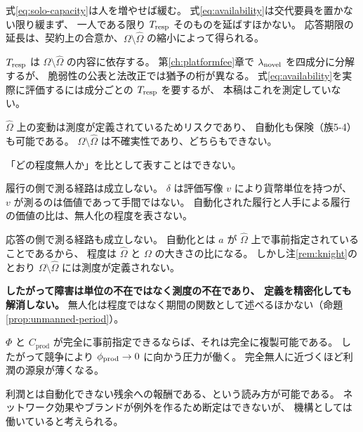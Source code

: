 \begin{remark}[緩和の方向が異なる]
式\eqref{eq:solo-capacity}は人を増やせば緩む。
式\eqref{eq:availability}は交代要員を置かない限り緩まず、
一人である限り $T_{\rm resp}$ そのものを延ばすほかない。
応答期限の延長は、契約上の合意か、$\Omega\setminus\hat\Omega$ の縮小によって得られる。
\end{remark}

\begin{remark}
\label{rem:tresp-components}
$T_{\rm resp}$ は $\Omega\setminus\hat\Omega$ の内容に依存する。
第\ref{ch:platformfee}章で $\lambda_{\rm novel}$ を四成分に分解するが、
脆弱性の公表と法改正では猶予の桁が異なる。
式\eqref{eq:availability}を実際に評価するには成分ごとの $T_{\rm resp}$ を要するが、
本稿はこれを測定していない。
\end{remark}

\begin{remark}[ナイトの区別との対応]
\label{rem:knight}
$\hat\Omega$ 上の変動は測度が定義されているためリスクであり、
自動化も保険（族5-4）も可能である。
$\Omega\setminus\hat\Omega$ は不確実性であり、どちらもできない。
\end{remark}

\begin{remark}[無人化の程度は定義できない]
\label{rem:automation-rate-illposed}
「どの程度無人か」を比として表すことはできない。

履行の側で測る経路は成立しない。
$\delta$ は評価写像 $v$ により貨幣単位を持つが、
$v$ が測るのは価値であって手間ではない。
自動化された履行と人手による履行の価値の比は、無人化の程度を表さない。

応答の側で測る経路も成立しない。
自動化とは $a$ が $\hat\Omega$ 上で事前指定されていることであるから、
程度は $\hat\Omega$ と $\Omega$ の大きさの比になる。
しかし注\ref{rem:knight}のとおり $\Omega\setminus\hat\Omega$ には測度が定義されない。

\textbf{したがって障害は単位の不在ではなく測度の不在であり、
定義を精密化しても解消しない。}
無人化は程度ではなく期間の関数として述べるほかない（命題\ref{prop:unmanned-period}）。
\end{remark}

\begin{remark}[無人化と利潤の関係]
$\Phi$ と $C_{\mathrm{prod}}$ が完全に事前指定できるならば、それは完全に複製可能である。
したがって競争により $\phi_{\rm prod}\to 0$ に向かう圧力が働く。
完全無人に近づくほど利潤の源泉が薄くなる。

利潤とは自動化できない残余への報酬である、という読み方が可能である。
ネットワーク効果やブランドが例外を作るため断定はできないが、
機構としては働いていると考えられる。
\end{remark}

